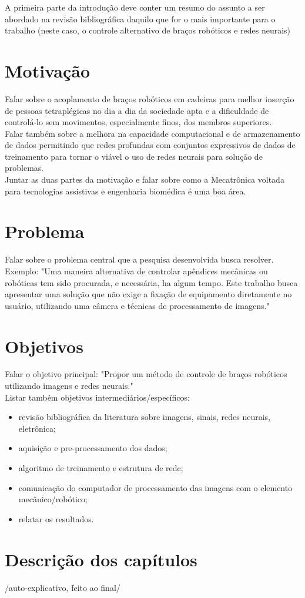 A primeira parte da introdução deve conter um resumo do assunto a ser abordado na revisão bibliográfica daquilo que for o mais importante para o trabalho (neste caso, o controle alternativo de braços robóticos e redes neurais) 

\section{Motivação}%
Falar sobre o acoplamento de braços robóticos em cadeiras para melhor inserção de pessoas tetraplégicas no dia a dia da sociedade apta e a dificuldade de controlá-lo sem movimentos, especialmente finos, dos membros superiores. 
\\Falar também sobre a melhora na capacidade computacional e de armazenamento de dados permitindo que redes profundas com conjuntos expressivos de dados de treinamento para tornar o viável o uso de redes neurais para solução de problemas. 
\\Juntar as duas partes da motivação e falar sobre como a Mecatrônica voltada para tecnologias assistivas e engenharia biomédica é uma boa área. 

\section{Problema}
Falar sobre o problema central que a pesquisa desenvolvida busca resolver.
\\Exemplo: "Uma maneira alternativa de controlar apêndices mecânicas ou robóticas tem sido procurada, e necessária, ha algum tempo. Este trabalho busca apresentar uma solução que não exige a fixação de equipamento diretamente no usuário, utilizando uma câmera e técnicas de processamento de imagens."

\section{Objetivos}
Falar o objetivo principal: "Propor um método de controle de braços robóticos utilizando imagens e redes neurais."
\\Listar também objetivos intermediários/específicos:

\begin{itemize}
    \item revisão bibliográfica da literatura sobre imagens, sinais, redes neurais, eletrônica;
    \item aquisição e pre-processamento dos dados;
    \item algoritmo de treinamento e estrutura de rede;
    \item comunicação do computador de processamento das imagens com o elemento mecânico/robótico;
    \item relatar os resultados.
\end{itemize}%

\section{Descrição dos capítulos}
/auto-explicativo, feito ao final/